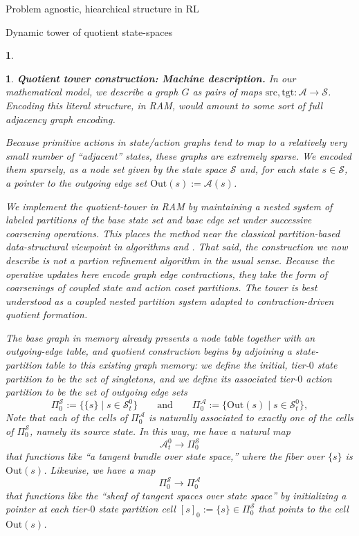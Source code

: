 \documentclass[11pt]{article}
\newtheorem{ermark}[subsubsection]{}
\begin{document}
\begin{section}{Problem agnostic, hiearchical structure in RL}
\begin{subsection}{Dynamic tower of quotient state-spaces}
\begin{ermark}
\end{ermark}

\begin{ermark}
{\bf Quotient tower construction: {\em Machine description}.}
\normalfont
In our mathematical model, we describe a graph $G$ as pairs of maps $\text{src},\text{tgt}:\mathcal{A}\longrightarrow\mathcal{S}$. Encoding this literal structure, in RAM, would amount to some sort of full adjacency graph encoding. 

Because primitive actions in state/action graphs tend to map to a relatively {\em very} small number of ``adjacent'' states, these graphs are extremely sparse. We encoded them sparsely, as a node set given by the state space $\mathcal{S}$ and, for each state $s\in\mathcal{S}$, a pointer to the outgoing edge set $\text{Out}(s):=\mathcal{A}(s)$.

We implement the quotient-tower in RAM by maintaining a nested system of labeled partitions of the base state set and base edge set under successive coarsening operations. This places the method near the classical partition-based data-structural viewpoint in algorithms \cite{PaigeTarjan1987} and \cite{HabibPaulViennot1999}. That said, the construction we now describe is not a {\em partion refinement algorithm} in the usual sense. Because the operative updates here encode graph edge contractions, they take the form of {\em coarsenings} of coupled state and action coset partitions. The tower is best understood as a coupled nested partition system adapted to contraction-driven quotient formation.

The base graph in memory already presents a node table together with an outgoing-edge table, and quotient construction begins by adjoining a state-partition table to this existing graph memory: we define the initial, {\em tier-}$0$ {\em state partition} to be the set of singletons, and we define its  associated {\em tier-}$0$ {\em action partition} to be the set of outgoing edge sets 
$$
\Pi_0^{\mathcal S}:=\bigl\{\{s\}\mid s\in\mathcal{S}_t^0\bigr\}
\qquad\text{and}\qquad
\Pi_0^{\mathcal A}:=\bigl\{\text{Out}(s)\mid s\in\mathcal{S}_t^0\bigr\},
$$
Note that each of the cells of $\Pi_0^{\mathcal A}$ is naturally associated to exactly one of the cells of $\Pi_0^{\mathcal S}$, namely its source state. In this way, me have a natural map
$$
\mathcal{A}^{0}_{t}\longrightarrow\Pi_0^{\mathcal S}
$$
that functions like ``a tangent bundle over state space,'' where the fiber over $\{s\}$ is $\text{Out}(s)$. Likewise, we have a map
$$
\Pi_0^{\mathcal S}\longrightarrow\Pi_0^{\mathcal A}
$$
that functions like the ``sheaf of tangent spaces over state space'' by  initializing a pointer at each tier-$0$ state partition cell $[s]_{0}:=\{s\}\in\Pi_0^{\mathcal S}$ that points to the cell $\text{Out}(s)$.


\end{ermark}
\end{subsection}
\end{section}
\end{document}
